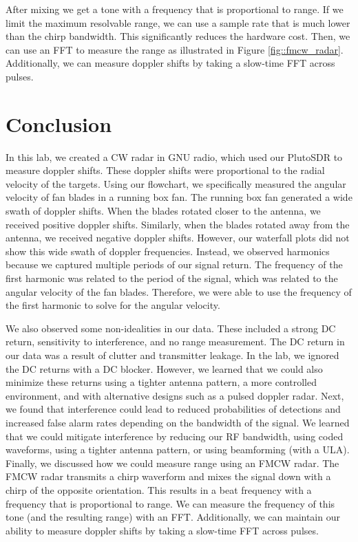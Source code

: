 \documentclass{article}
\begin{document}
\noindent After mixing we get a tone with a frequency that is proportional to range. If we limit the maximum resolvable range, we can use a sample rate that is much lower than the chirp bandwidth. This significantly reduces the hardware cost. Then, we can use an FFT to measure the range as illustrated in Figure \ref{fig::fmcw_radar}. Additionally, we can measure doppler shifts by taking a slow-time FFT across pulses.

\section{Conclusion}

In this lab, we created a CW radar in GNU radio, which used our PlutoSDR to measure doppler shifts. These doppler shifts were proportional to the radial velocity of the targets. Using our flowchart, we specifically measured the angular velocity of fan blades in a running box fan. The running box fan generated a wide swath of doppler shifts. When the blades rotated closer to the antenna, we received positive doppler shifts. Similarly, when the blades rotated away from the antenna, we received negative doppler shifts. However, our waterfall plots did not show this wide swath of doppler frequencies. Instead, we observed harmonics because we captured multiple periods of our signal return. The frequency of the first harmonic was related to the period of the signal, which was related to the angular velocity of the fan blades. Therefore, we were able to use the frequency of the first harmonic to solve for the angular velocity.

We also observed some non-idealities in our data. These included a strong DC return, sensitivity to interference, and no range measurement. The DC return in our data was a result of clutter and transmitter leakage. In the lab, we ignored the DC returns with a DC blocker. However, we learned that we could also minimize these returns using a tighter antenna pattern, a more controlled environment, and with alternative designs such as a pulsed doppler radar. Next, we found that interference could lead to reduced probabilities of detections and increased false alarm rates depending on the bandwidth of the signal. We learned that we could mitigate interference by reducing our RF bandwidth, using coded waveforms, using a tighter antenna pattern, or using beamforming (with a ULA). Finally, we discussed how we could measure range using an FMCW radar. The FMCW radar transmits a chirp waverform and mixes the signal down with a chirp of the opposite orientation. This results in a beat frequency with a frequency that is proportional to range. We can measure the frequency of this tone (and the resulting range) with an FFT. Additionally, we can maintain our ability to measure doppler shifts by taking a slow-time FFT across pulses.
 




{}
\end{document}
